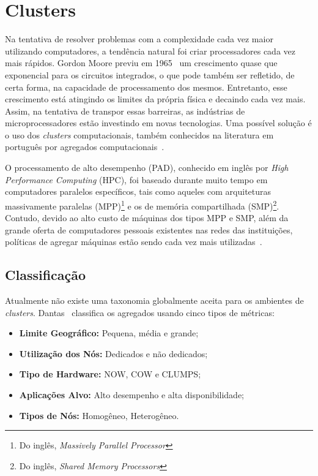 \documentclass[12pt]{report} %
\begin{document}
    \section{Clusters}
	Na tentativa de resolver problemas com a complexidade cada vez maior utilizando computadores, a tendência natural foi criar processadores cada vez mais rápidos.
	Gordon Moore previu em 1965~\cite{moore} um crescimento quase que exponencial para os circuitos integrados, o que pode também ser refletido, de certa forma, na capacidade de processamento dos mesmos.
	Entretanto, esse crescimento está atingindo os limites da própria física e decaindo cada vez mais.
	Assim, na tentativa de transpor essas barreiras, as indústrias de microprocessadores estão investindo em novas tecnologias.
	Uma possível solução é o uso dos \textit{clusters} computacionais, também conhecidos na literatura em português por agregados computacionais~\cite{marioLivro}.	
	
	O processamento de alto desempenho (PAD), conhecido em inglês por \textit{High Performance Computing} (HPC), foi baseado durante muito tempo em computadores paralelos específicos, tais como aqueles com arquiteturas massivamente paralelas (MPP)\footnote{Do inglês, \textit{Massively Parallel Processor}} e os de memória compartilhada (SMP)\footnote{Do inglês, \textit{Shared Memory Processors}}.
	Contudo, devido ao alto custo de máquinas dos tipos MPP e SMP, além da grande oferta de computadores pessoais existentes nas redes das instituições, políticas de agregar máquinas estão sendo cada vez mais utilizadas~\cite{marioLivro}.

	\subsection{Classificação}
	    Atualmente não existe uma taxonomia globalmente aceita para os ambientes de \textit{clusters}.
	    Dantas~\cite{marioLivro} classifica os agregados usando cinco tipos de métricas:

	    \begin{itemize}
		\item \textbf{Limite Geográfico:}  Pequena, média e grande;
		\item \textbf{Utilização dos Nós:} Dedicados e não dedicados;
		\item \textbf{Tipo de Hardware:} NOW, COW e CLUMPS;
		\item \textbf{Aplicações Alvo:}  Alto desempenho e alta disponibilidade;
		\item \textbf{Tipos de Nós:}  Homogêneo, Heterogêneo.
	    \end{itemize}
\end{document}
